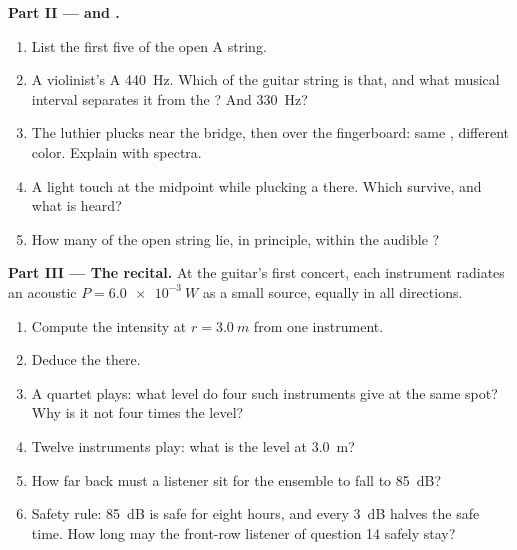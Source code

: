 \begin{problem}
\medskip
\noindent\textbf{Part II ---  and .}
\begin{enumerate}[resume]
  \item List the first five  of the open A string.
  \item A violinist's A  \qty{440}{Hz}. Which  of the
        guitar string is that, and what musical interval separates
        it from the ? And \qty{330}{Hz}?
  \item The luthier plucks near the bridge, then over the
        fingerboard: same , different color. Explain with spectra.
  \item A light touch at the midpoint while plucking  a 
        there. Which  survive, and what  is heard?
  \item How many  of the open string lie, in principle,
        within the audible ?
\end{enumerate}

\medskip
\noindent\textbf{Part III --- The recital.}
At the guitar's first concert, each instrument radiates an acoustic
 $P = \qty{6.0e-3}{W}$ as a small source, equally in all
directions.
\begin{enumerate}[resume]
  \item Compute the intensity at $r = \qty{3.0}{m}$ from one instrument.
  \item Deduce the  there.
  \item A quartet plays: what level do four such instruments give
        at the same spot? Why is it not four times the level?
  \item Twelve instruments play: what is the level at \qty{3.0}{m}?
  \item How far back must a listener sit for the ensemble to fall
        to \qty{85}{dB}?
  \item Safety rule: \qty{85}{dB} is safe for eight hours, and
        every \qty{+3}{dB} halves the safe time. How long may the
        front-row listener of question 14 safely stay?
\end{enumerate}


\end{problem}
